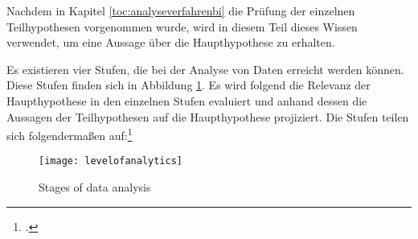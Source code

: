 Nachdem in Kapitel \ref{toc:analyseverfahrenbi} die Prüfung der einzelnen Teilhypothesen vorgenommen wurde,
wird in diesem Teil dieses Wissen verwendet, um eine Aussage über die Haupthypothese zu erhalten.

Es existieren vier Stufen, die bei der Analyse von Daten erreicht werden können. Diese Stufen finden sich in Abbildung
\ref{figure:levelofanalysis}. Es wird folgend die Relevanz der Haupthypothese in den einzelnen Stufen evaluiert
und anhand dessen die Aussagen der Teilhypothesen auf die Haupthypothese projiziert. Die Stufen teilen sich
folgendermaßen auf:\footcite[Cf.][Fig. 2]{bihani2014comparative}

\begin{figure}[H]
    \caption{Stages of data analysis}
    \texttt{[image: levelofanalytics]}
    \label{figure:levelofanalysis}
    \\
    \cite[Source: Based on][Fig. 2]{bihani2014comparative}
\end{figure}

